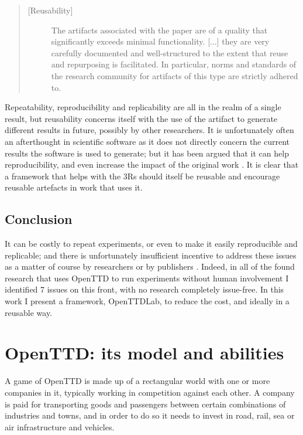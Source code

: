 \documentclass[logo,msc,dsti]{infthesis}    %
\begin{document}
{\begin{quote}
\begin{description}
\item[{[}Reusability{]}] 
The artifacts associated with the paper are of a quality that significantly exceeds minimal functionality. [...] they are very carefully documented and well-structured to the extent that reuse and repurposing is facilitated. In particular, norms and standards of the research community for artifacts of this type are strictly adhered to. 
\end{description}
\end{quote}
Repeatability, reproducibility and replicability are all in the realm of a single result, but reusability concerns itself with the use of the artifact to generate different results in future, possibly by other researchers. It is unfortunately often an afterthought in scientific software as it does not directly concern the current results the software is used to generate; but it has been argued that it can help reproducibility, and even increase the impact of the original work \cite{benureau2018re}. It is clear that a framework that helps with the 3Rs should itself be reusable and encourage reusable artefacts in work that uses it.

\section{Conclusion}

It can be costly to repeat experiments, or even to make it easily reproducible and replicable; and there is unfortunately insufficient incentive to address these issues as a matter of course by researchers or by publishers \cite{benureau2018re}. Indeed, in all of the found research that uses OpenTTD to run experiments without human involvement I identified 7 issues on this front, with no research completely issue-free. In this work I present a framework, OpenTTDLab, to reduce the cost, and ideally in a reusable way.

\chapter{OpenTTD: its model and abilities}
\label{chapter:openttd-model-and-abilities}

A game of OpenTTD is made up of a rectangular world with one or more companies in it, typically working in competition against each other. A company is paid for transporting goods and passengers between certain combinations of industries and towns, and in order to do so it needs to invest in road, rail, sea or air infrastructure and vehicles.

}
\end{document}
